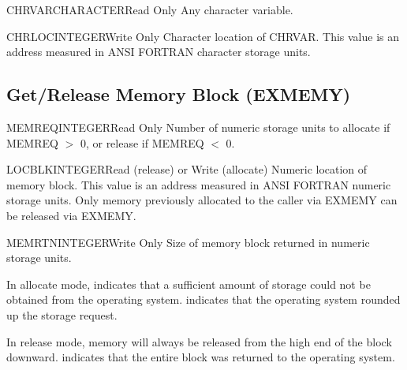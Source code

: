 
\begin{argy}{CHRVAR}{CHARACTER}{Read Only}
Any character variable.
\end{argy}

\begin{argy}{CHRLOC}{INTEGER}{Write Only}
Character location of CHRVAR.  This value is an address measured in ANSI
FORTRAN character storage units.
\end{argy}


\subsection{Get/Release Memory Block (EXMEMY)} \label{sec:exmemy}


\begin{argy}{MEMREQ}{INTEGER}{Read Only}
Number of numeric storage units to allocate if MEMREQ $>$ 0, or release if
MEMREQ $<$ 0.
\end{argy}

\begin{argy}{LOCBLK}{INTEGER}{Read (release) or Write (allocate)}
Numeric location of memory block.  This value is an address measured in ANSI
FORTRAN numeric storage units. Only memory previously allocated to the
caller via EXMEMY can be released via EXMEMY.
\end{argy}

\begin{argy}{MEMRTN}{INTEGER}{Write Only}
Size of memory block returned in numeric storage units.
\end{argy}

In allocate mode,  indicates that a sufficient amount of
storage could not be obtained from the operating system.  
indicates that the operating system rounded up the storage request.

In release mode, memory will always be released from the high end of the
block downward.   indicates that the entire block was returned to
the operating system.
